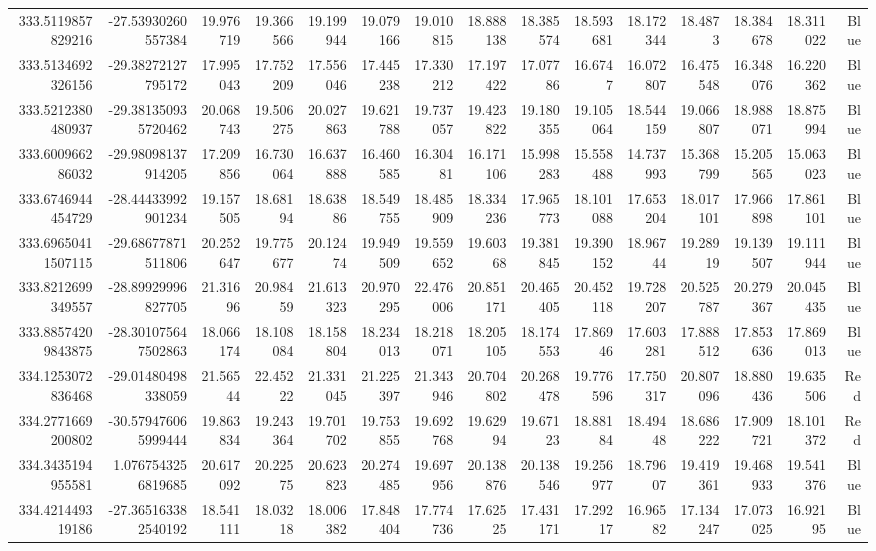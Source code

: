 \begin{center}
\begin{longtable}{rrrrrrrrrrrrrrr}
333.5119857829216 & -27.53930260557384 & 19.976719 & 19.366566 & 19.199944 & 19.079166 & 19.010815 & 18.888138 & 18.385574 & 18.593681 & 18.172344 & 18.4873 & 18.384678 & 18.311022 & Blue \\
333.5134692326156 & -29.38272127795172 & 17.995043 & 17.752209 & 17.556046 & 17.445238 & 17.330212 & 17.197422 & 17.07786 & 16.6747 & 16.072807 & 16.475548 & 16.348076 & 16.220362 & Blue \\
333.5212380480937 & -29.381350935720462 & 20.068743 & 19.506275 & 20.027863 & 19.621788 & 19.737057 & 19.423822 & 19.180355 & 19.105064 & 18.544159 & 19.066807 & 18.988071 & 18.875994 & Blue \\
333.600966286032 & -29.98098137914205 & 17.209856 & 16.730064 & 16.637888 & 16.460585 & 16.30481 & 16.171106 & 15.998283 & 15.558488 & 14.737993 & 15.368799 & 15.205565 & 15.063023 & Blue \\
333.6746944454729 & -28.44433992901234 & 19.157505 & 18.68194 & 18.63886 & 18.549755 & 18.485909 & 18.334236 & 17.965773 & 18.101088 & 17.653204 & 18.017101 & 17.966898 & 17.861101 & Blue \\
333.69650411507115 & -29.68677871511806 & 20.252647 & 19.775677 & 20.12474 & 19.949509 & 19.559652 & 19.60368 & 19.381845 & 19.390152 & 18.96744 & 19.28919 & 19.139507 & 19.111944 & Blue \\
333.8212699349557 & -28.89929996827705 & 21.31696 & 20.98459 & 21.613323 & 20.970295 & 22.476006 & 20.851171 & 20.465405 & 20.452118 & 19.728207 & 20.525787 & 20.279367 & 20.045435 & Blue \\
333.88574209843875 & -28.301075647502863 & 18.066174 & 18.108084 & 18.158804 & 18.234013 & 18.218071 & 18.205105 & 18.174553 & 17.86946 & 17.603281 & 17.888512 & 17.853636 & 17.869013 & Blue \\
334.1253072836468 & -29.01480498338059 & 21.56544 & 22.45222 & 21.331045 & 21.225397 & 21.343946 & 20.704802 & 20.268478 & 19.776596 & 17.750317 & 20.807096 & 18.880436 & 19.635506 & Red \\
334.2771669200802 & -30.579476065999444 & 19.863834 & 19.243364 & 19.701702 & 19.753855 & 19.692768 & 19.62994 & 19.67123 & 18.88184 & 18.49448 & 18.686222 & 17.909721 & 18.101372 & Red \\
334.3435194955581 & 1.0767543256819685 & 20.617092 & 20.22575 & 20.623823 & 20.274485 & 19.697956 & 20.138876 & 20.138546 & 19.256977 & 18.79607 & 19.419361 & 19.468933 & 19.541376 & Blue \\
334.421449319186 & -27.365163382540192 & 18.541111 & 18.03218 & 18.006382 & 17.848404 & 17.774736 & 17.62525 & 17.431171 & 17.29217 & 16.96582 & 17.134247 & 17.073025 & 16.92195 & Blue \\

\end{longtable}
\end{center}
